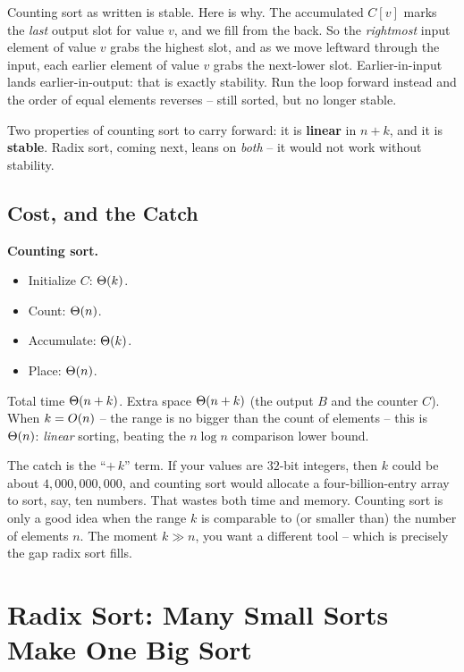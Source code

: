 Counting sort as written is stable. Here is why. The accumulated
$C[v]$ marks the \emph{last} output slot for value $v$, and we fill from the
back. So the \emph{rightmost} input element of value $v$ grabs the highest slot,
and as we move leftward through the input, each earlier element of value $v$
grabs the next-lower slot. Earlier-in-input lands earlier-in-output: that is
exactly stability. Run the loop forward instead and the order of equal elements
reverses -- still sorted, but no longer stable.

\begin{focusbox}
Two properties of counting sort to carry forward: it is \textbf{linear} in
$n + k$, and it is \textbf{stable}. Radix sort, coming next, leans on
\emph{both} -- it would not work without stability.
\end{focusbox}

\subsection{Cost, and the Catch}

\begin{complexitybox}
\textbf{Counting sort.}
\begin{itemize}
\item Initialize $C$: $\Theta(k)$.
\item Count: $\Theta(n)$.
\item Accumulate: $\Theta(k)$.
\item Place: $\Theta(n)$.
\end{itemize}
Total time $\Theta(n + k)$. Extra space $\Theta(n + k)$ (the output $B$ and the
counter $C$). When $k = O(n)$ -- the range is no bigger than the count of
elements -- this is $\Theta(n)$: \emph{linear} sorting, beating the $n\log n$
comparison lower bound.
\end{complexitybox}

\begin{trapbox}
The catch is the ``$+\,k$'' term. If your values are $32$-bit
integers, then $k$ could be about $4{,}000{,}000{,}000$, and counting sort would
allocate a four-billion-entry array to sort, say, ten numbers. That wastes
both time and memory. Counting sort is only a good idea when the
range $k$ is comparable to (or smaller than) the number of elements $n$. The
moment $k \gg n$, you want a different tool -- which is precisely the gap radix
sort fills.
\end{trapbox}

\section{Radix Sort: Many Small Sorts Make One Big Sort}

